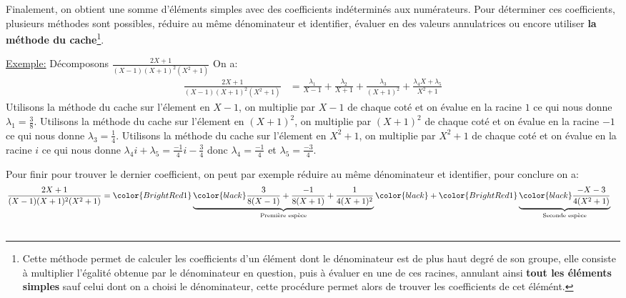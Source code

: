 Finalement, on obtient une somme d'éléments simples avec des coefficients indéterminés aux numérateurs. Pour déterminer ces coefficients, plusieurs méthodes sont possibles, réduire au même dénominateur et identifier, évaluer en des valeurs annulatrices ou encore utiliser \textbf{la méthode du cache}\footnote[2]{Cette méthode permet de calculer les coefficients d'un élément dont le dénominateur est de plus haut degré de son groupe, elle consiste à multiplier l'égalité obtenue par le dénominateur en question, puis à évaluer en une de ces racines, annulant ainsi \textbf{tout les éléments simples} sauf celui dont on a choisi le dénominateur, cette procédure permet alors de trouver les coefficients de cet élémént.}.\< 

\underline{Exemple:} Décomposons \(\frac{2X+1}{(X-1)(X+1)^2(X^2+1)}\)\+
On a:
   \begin{align*}
      \frac{2X+1}{(X-1)(X+1)^2(X^2+1)} &= \frac{\lambda_1}{X-1} + \frac{\lambda_2}{X+1}+ \frac{\lambda_3}{(X+1)^2} + \frac{\lambda_4X+ \lambda_5}{X^2+1}
   \end{align*}
Utilisons la méthode du cache sur l'élement en \(X-1\), on multiplie par \(X-1\) de chaque coté et on évalue en la racine \(1\) ce qui nous donne \(\lambda_1 = \frac{3}{8}\).\+
Utilisons la méthode du cache sur l'élement en \((X+1)^2\), on multiplie par \((X+1)^2\) de chaque coté et on évalue en la racine \(-1\) ce qui nous donne \(\lambda_3 = \frac{1}{4}\).\+
Utilisons la méthode du cache sur l'élement en \(X^2+1\), on multiplie par \(X^2+1\) de chaque coté et on évalue en la racine \(i\) ce qui nous donne \(\lambda_4i+\lambda_5 = \frac{-1}{4}i - \frac{3}{4}\) donc \(\lambda_4=\frac{-1}{4}\) et \(\lambda_5=\frac{-3}{4}\).\<

Pour finir pour trouver le dernier coefficient, on peut par exemple réduire au même dénominateur et identifier, pour conclure on a:
\begin{align*}
   \frac{2X+1}{(X-1)(X+1)^2(X^2+1)} &= \color{BrightRed1}\underbrace{\color{black}\frac{3}{8(X-1)} + \frac{-1}{8(X+1)}+ \frac{1}{4(X+1)^2}}_\text{Première espèce} \color{black}+\color{BrightRed1}\underbrace{\color{black} \frac{-X - 3}{4(X^2+1)}}_\text{Seconde espèce} 
\end{align*}

\subsection*{}

